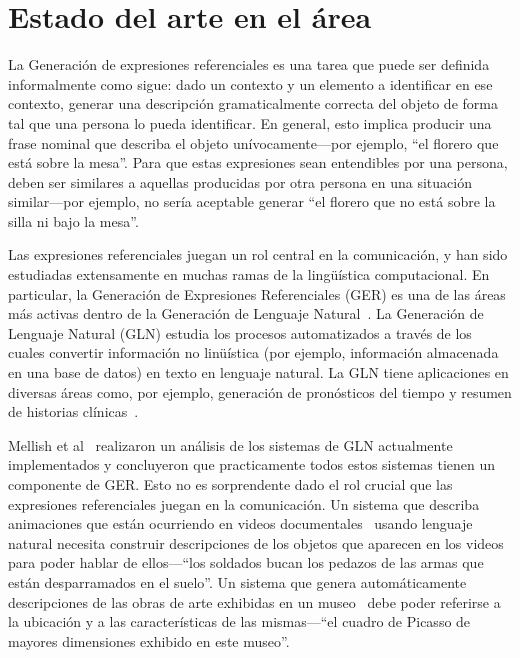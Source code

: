 \section{Estado del arte en el \'area}
\label{intro}

La Generaci\'on de expresiones referenciales es una tarea que puede ser definida informalmente como sigue: dado un contexto y un elemento a identificar en ese contexto, generar una descripci\'on gramaticalmente correcta del objeto de forma tal que una persona lo pueda identificar. En general, esto implica producir una frase nominal que describa el objeto un\'ivocamente---por ejemplo, ``el florero que est\'a sobre la mesa''. Para que estas expresiones sean entendibles por una persona, deben ser similares a aquellas producidas por otra persona en una situaci\'on similar---por ejemplo, no ser\'ia aceptable generar ``el florero que no est\'a sobre la silla ni bajo la mesa''. 

Las expresiones referenciales juegan un rol central en la comunicaci\'on, y han sido estudiadas extensamente en muchas ramas de la ling\"u\'istica computacional. En particular, la Generaci\'on de Expresiones Referenciales (GER) es una de las \'areas m\'as activas dentro de la Generaci\'on de Lenguaje Natural~\cite{KrahmerEmielandVanDeemter2011}. La Generaci\'on de Lenguaje Natural (GLN) estudia los procesos automatizados a trav\'es de los cuales convertir informaci\'on no lin\"u\'istica (por ejemplo, informaci\'on almacenada en una base de datos) en texto en lenguaje natural. La GLN tiene aplicaciones en diversas \'areas como, por ejemplo, generaci\'on de pron\'osticos del tiempo y resumen de historias cl\'inicas~\cite{Reiter2000}. 

Mellish et al~\cite{Mellish2006} realizaron un an\'alisis de los sistemas de GLN actualmente implementados y concluyeron que practicamente todos estos sistemas tienen un componente de GER. Esto no es sorprendente dado el rol crucial que las expresiones referenciales juegan en la comunicaci\'on. Un sistema que describa animaciones que est\'an ocurriendo en videos documentales~\cite{Callaway2005} usando lenguaje natural necesita construir descripciones de los objetos que aparecen en los videos para poder hablar de ellos---``los soldados bucan los pedazos de las armas que est\'an desparramados en el suelo''. Un sistema que genera autom\'aticamente descripciones de las obras de arte exhibidas en un museo~\cite{Cox1999} debe poder referirse a la ubicaci\'on y a las caracter\'isticas de las mismas---``el cuadro de Picasso de mayores dimensiones exhibido en este museo''. 

